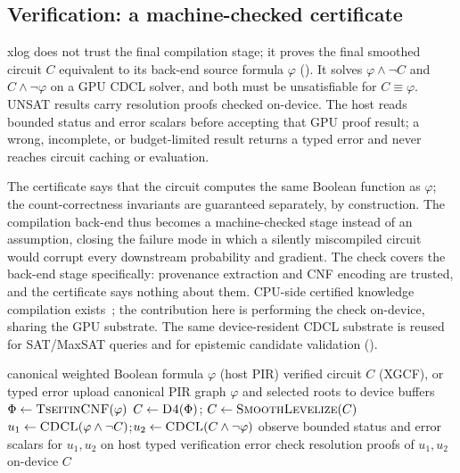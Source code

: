 \subsection{Verification: a machine-checked certificate}

xlog does not trust the final compilation stage; it proves the final smoothed circuit $C$ equivalent to its back-end source formula $\varphi$ (). It solves $\varphi \land \lnot C$ and $C \land \lnot \varphi$ on a GPU CDCL solver, and both must be unsatisfiable for $C \equiv \varphi$. UNSAT results carry resolution proofs checked on-device. The host reads bounded status and error scalars before accepting that GPU proof result; a wrong, incomplete, or budget-limited result returns a typed error and never reaches circuit caching or evaluation.

The certificate says that the circuit computes the same Boolean function as $\varphi$; the count-correctness invariants are guaranteed separately, by construction. The compilation back-end thus becomes a machine-checked stage instead of an assumption, closing the failure mode in which a silently miscompiled circuit would corrupt every downstream probability and gradient. The check covers the back-end stage specifically: provenance extraction and CNF encoding are trusted, and the certificate says nothing about them. CPU-side certified knowledge compilation exists~\cite{capelli2019}; the contribution here is performing the check on-device, sharing the GPU substrate. The same device-resident CDCL substrate is reused for SAT/MaxSAT queries and for epistemic candidate validation ().

\begin{algorithm}[htbp]
\caption{Verified knowledge compilation. The final smoothed circuit is accepted only if proven equivalent to its back-end source formula.}
\label{alg:verifiedkc}
\begin{algorithmic}[1]
\Require canonical weighted Boolean formula $\varphi$ (host PIR)
\Ensure verified circuit $C$ (XGCF), or typed error
\State upload canonical PIR graph $\varphi$ and selected roots to device buffers
\State $\Phi \gets \textsc{TseitinCNF}(\varphi)$ 
\State $C \gets \textsc{D4}(\Phi)$; $C \gets \textsc{SmoothLevelize}(C)$
\State $u_1 \gets \textsc{CDCL}(\varphi \land \lnot C)$;\quad $u_2 \gets \textsc{CDCL}(C \land \lnot \varphi)$
\State observe bounded status and error scalars for $u_1,u_2$ on host
  \State \Return typed verification error
\EndIf
\State check resolution proofs of $u_1, u_2$ on-device
\State \Return $C$ 
\end{algorithmic}
\end{algorithm}


